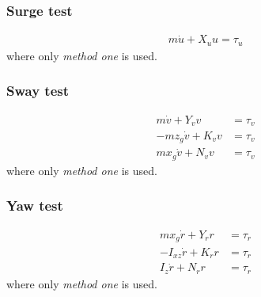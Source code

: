 

\subsubsection{Surge test}
\begin{align}
m\dot u + X_uu = \tau_{u}
\end{align}
where only \textit{method one} is used.

\subsubsection{Sway test}
\begin{align}
m\dot v + Y_vv &= \tau_{v}\\
-mz_g\dot v + K_vv &= \tau_{v}\\
mx_g\dot v + N_vv &= \tau_{v}
\end{align}
where only \textit{method one} is used.

\subsubsection{Yaw test}
\begin{align}
mx_g\dot r + Y_rr &= \tau_{r}\\
-I_{xz}\dot r + K_rr &= \tau_{r}\\
I_z\dot r + N_rr &= \tau_{r}
\end{align}
where only \textit{method one} is used.

